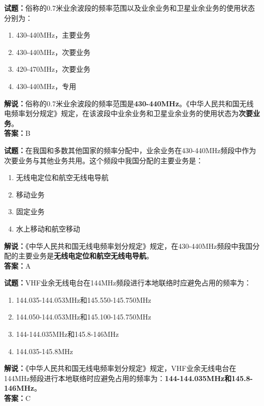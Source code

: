 \documentclass{ctexbook}
\begin{document}
\noindent\textbf{试题：}俗称的0.7米业余波段的频率范围以及业余业务和卫星业余业务的使用状态分别为：
\begin{enumerate}[leftmargin=3em]
  \item 430-440\unit{\MHz}，主要业务
  \item 430-440\unit{\MHz}，次要业务
  \item 420-470\unit{\MHz}，次要业务
  \item 430-440\unit{\MHz}，专用
\end{enumerate}
\noindent\textbf{解说：}俗称的0.7米业余波段的频率范围是\textbf{430-440\unit{\MHz}}。《中华人民共和国无线电频率划分规定》规定，在该波段中业余业务和卫星业余业务的使用状态为\textbf{次要业务}。\\\noindent\textbf{答案：}B
\vspace{\baselineskip}

\noindent\textbf{试题：}在我国和多数其他国家的频率分配中，业余业务在430-440\unit{\MHz}频段中作为次要业务与其他业务共用。这个频段中我国分配的主要业务是：
\begin{enumerate}[leftmargin=3em]
  \item 无线电定位和航空无线电导航
  \item 移动业务
  \item 固定业务
  \item 水上移动和航空移动
\end{enumerate}
\noindent\textbf{解说：}《中华人民共和国无线电频率划分规定》规定，在430-440\unit{\MHz}频段中我国分配的主要业务是\textbf{无线电定位和航空无线电导航}。\\\noindent\textbf{答案：}A

\vspace{\baselineskip}

\noindent\textbf{试题：}VHF业余无线电台在144\unit{\MHz}频段进行本地联络时应避免占用的频率为：
\begin{enumerate}[leftmargin=3em]
  \item 144.035-144.053\unit{\MHz}和145.550-145.750\unit{\MHz}
  \item 144.050-144.053\unit{\MHz}和145.100-145.750\unit{\MHz}
  \item 144-144.035\unit{\MHz}和145.8-146\unit{\MHz}
  \item 144.035-145.8\unit{\MHz}
\end{enumerate}
\noindent\textbf{解说：}《中华人民共和国无线电频率划分规定》规定，VHF业余无线电台在144\unit{\MHz}频段进行本地联络时应避免占用的频率为：\textbf{144-144.035\unit{\MHz}和145.8-146\unit{\MHz}}。\\\noindent\textbf{答案：}C
\end{document}
